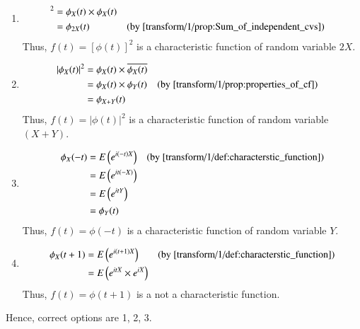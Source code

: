    \begin{enumerate}
       \item \begin{align} [\phi_X(t)]^2 &= \phi_X(t)\times\phi_X(t) \\
                   &= \phi_{2X}(t) & & \text{(by  \ref{transform/1/prop:Sum_of_independent_cvs})}
   \end{align}
   Thus, $f(t) = [\phi(t)]^2$ is a characteristic function of random variable $2X$.
   \item \begin{align} |\phi_X(t)|^2 &= \phi_X(t)\times\overline{\phi_X(t)} \\
                   &= \phi_X(t)\times\phi_Y(t) & & \text{(by  \ref{transform/1/prop:properties_of_cf})}\\
                   &= \phi_{X+Y}(t)
   \end{align}
   Thus, $f(t)=|\phi(t)|^2$ is a characteristic function of random variable $(X+Y)$.\\
   \item \begin{align} \phi_X(-t) &= E\left(e^{i(-t)X}\right) & & \text{(by  \ref{transform/1/def:characterstic_function})} \\
                   &= E\left(e^{it(-X)}\right) \\
                   &= E\left(e^{itY}\right)\\
                   &= \phi_Y(t)
   \end{align}
   Thus, $f(t) = \phi(-t)$ is a characteristic function of random variable $Y$.
   \item \begin{align} \phi_X(t+1) &= E\left(e^{i(t+1)X}\right)  & & \text{(by  \ref{transform/1/def:characterstic_function})} \\
   &= E\left(e^{itX}\times e^{iX}\right) 
   \end{align}
   Thus, $f(t) = \phi(t+1)$ is a not a characteristic function.\\
   \end{enumerate}
   Hence, correct options are 1, 2, 3.
   